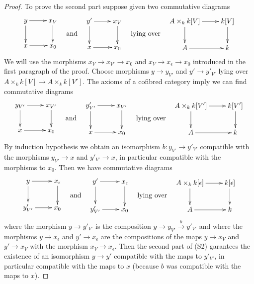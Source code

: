 \begin{proof}
\medskip\noindent
To prove the second part suppose given two commutative
diagrams
$$
\vcenter{
\xymatrix{
y \ar[r] \ar[d] & x_V \ar[d] \\
x \ar[r] & x_0
}
}
\quad\text{and}\quad
\vcenter{
\xymatrix{
y' \ar[r] \ar[d] & x_V \ar[d] \\
x \ar[r] & x_0
}
}
\quad\text{lying over}\quad
\vcenter{
\xymatrix{
A \times_k k[V] \ar[d] \ar[r] & k[V] \ar[d] \\
A \ar[r] & k
}
}
$$
We will use the morphisms $x_V \to x_{V'} \to x_0$ and
$x_V \to x_\epsilon \to x_0$ introduced in the first paragraph of the proof.
Choose morphisms $y \to y_{V'}$ and $y' \to y'_{V'}$
lying over $A \times_k k[V] \to A \times_k k[V']$. The axioms of a
cofibred category imply we can find commutative diagrams
$$
\vcenter{
\xymatrix{
y_{V'} \ar[r] \ar[d] & x_{V'} \ar[d] \\
x \ar[r] & x_0
}
}
\quad\text{and}\quad
\vcenter{
\xymatrix{
y'_{V'} \ar[r] \ar[d] & x_{V'} \ar[d] \\
x \ar[r] & x_0
}
}
\quad\text{lying over}\quad
\vcenter{
\xymatrix{
A \times_k k[V'] \ar[d] \ar[r] & k[V'] \ar[d] \\
A \ar[r] & k
}
}
$$
By induction hypothesis we obtain an isomorphism
$b : y_{V'} \to y'_{V'}$
compatible with the morphisms $y_{V'} \to x$ and $y'_{V'} \to x$,
in particular compatible with the morphisms to $x_0$.
Then we have commutative diagrams
$$
\vcenter{
\xymatrix{
y \ar[r] \ar[d] & x_\epsilon \ar[d] \\
y'_{V'} \ar[r] & x_0
}
}
\quad\text{and}\quad
\vcenter{
\xymatrix{
y' \ar[r] \ar[d] & x_\epsilon \ar[d] \\
y'_{V'} \ar[r] & x_0
}
}
\quad\text{lying over}\quad
\vcenter{
\xymatrix{
A \times_k k[\epsilon] \ar[d] \ar[r] & k[\epsilon] \ar[d] \\
A \ar[r] & k
}
}
$$
where the morphism $y \to y'_{V'}$ is the composition
$y \to y_{V'} \xrightarrow{b} y'_{V'}$ and where the morphisms
$y \to x_\epsilon$ and $y' \to x_\epsilon$ are the compositions of
the maps $y \to x_V$ and $y' \to x_V$ with the morphism $x_V \to x_\epsilon$.
Then the second part of (S2) garantees the existence of an isomorphism
$y \to y'$ compatible with the maps to $y'_{V'}$, in particular compatible
with the maps to $x$ (because $b$ was compatible with the maps to $x$).
\end{proof}

